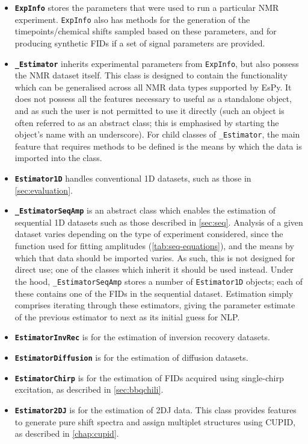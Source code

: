 \begin{itemize}
    \item \textbf{\textbf{\texttt{ExpInfo}}} stores the parameters that were
        used to run a particular \ac{NMR} experiment. \texttt{ExpInfo} also has
        methods for the generation of the timepoints/chemical shifts sampled
        based on these parameters, and for producing synthetic \acp{FID} if a
        set of signal parameters are provided.
    \item \textbf{\texttt{\_Estimator}} inherits experimental parameters from
        \texttt{ExpInfo}, but also possess the \ac{NMR} dataset itself.
        This class is designed to contain the functionality which can be
        generalised across all \ac{NMR} data types supported by \ac{EsPy}. It
        does not possess all the features necessary to useful as a standalone
        object, and as such the user is not permitted to use it directly (such
        an object is often referred to as an abstract class; this is emphasised
        by starting the object's name with an underscore). For child
        classes of \texttt{\_Estimator}, the main feature that requires methods
        to be defined is the means by which the data is imported into the class.
    \item \textbf{\texttt{Estimator1D}} handles conventional \ac{1D} datasets,
        such as those in \cref{sec:evaluation}.
    \item \textbf{\texttt{\_EstimatorSeqAmp}} is an abstract class
        which enables the estimation of sequential \ac{1D} datasets such as those
        described in \cref{sec:seq}. Analysis of a given dataset varies depending on
        the type of experiment considered, since the function used for
        fitting amplitudes (\cref{tab:seq-equations}), and the means by
        which that data should be imported varies. As such, this is not
        designed for direct use; one of the classes which inherit it should be
        used instead. Under the hood, \texttt{\_EstimatorSeqAmp} stores a
        number of \texttt{Estimator1D} objects; each of these contains one
        of the \acp{FID} in the sequential dataset. Estimation simply comprises
        iterating through these estimators, giving the parameter estimate of
        the previous estimator to next as its initial guess for \ac{NLP}.
    \item \textbf{\texttt{EstimatorInvRec}} is for the estimation of inversion
        recovery datasets.
    \item \textbf{\texttt{EstimatorDiffusion}} is for the estimation of
        diffusion datasets.
    \item \textbf{\texttt{EstimatorChirp}} is for the estimation of \acp{FID}
        acquired using single-chirp excitation, as described in \cref{sec:bbqchili}.
    \item \textbf{\texttt{Estimator2DJ}} is for the estimation of \ac{2DJ} data.
        This class provides features to generate pure shift spectra and
        assign multiplet structures using \ac{CUPID}, as described in
        \cref{chap:cupid}.
\end{itemize}

